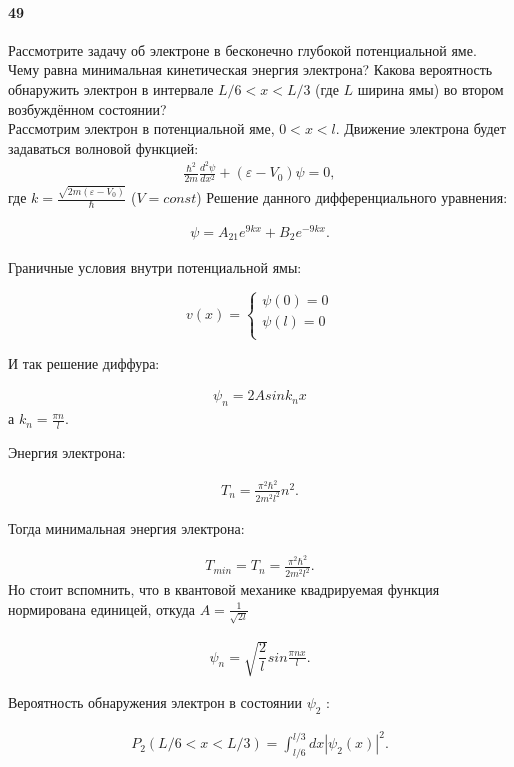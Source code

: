 




\paragraph{49}
Рассмотрите задачу об электроне в бесконечно глубокой потенциальной яме. Чему равна минимальная кинетическая энергия электрона? Какова вероятность обнаружить электрон в интервале $L/6<x<L/3$ (где $L$ ширина ямы) во втором возбуждённом состоянии?\\

Рассмотрим электрон в потенциальной яме, $0<x<l$.
Движение электрона будет задаваться волновой функцией:
\begin{gather}
 \frac{\hbar^{2}}{2m}\frac{d^{2}\psi}{dx^{2}}+(\varepsilon-V_{0})\psi=0,
\end{gather}
где $k=\frac{\sqrt{2m(\varepsilon-V_{0})}}{\hbar}$ ($V=const$)
Решение данного дифференциального уравнения:

\begin{gather}
\psi=A_{21}e^{9kx}+B_{2}e^{-9kx}.
\end{gather}

Граничные условия внутри потенциальной ямы:

$$
v(x)=
\left\{
\begin{gathered}
\psi(0)=0\\
\psi(l)=0\\
\end{gathered}
\right.
$$

И так решение диффура: 

\begin{gather}
\psi_{n}=2A sin{k_{n}x}
\end{gather}
а $k_{n}=\frac{\pi n}{l}.$

Энергия электрона:

\begin{gather}
T_{n}=\frac{\pi^{2}\hbar^{2}}{2m^{2}l^{2}}{}n^{2}.
\end{gather}

Тогда минимальная энергия электрона:

\begin{gather}
T_{min}=T_{n}=\frac{\pi^{2}\hbar^{2}}{2m^{2}l^{2}}.
\end{gather}
Но стоит вспомнить, что в квантовой механике квадрируемая функция нормирована единицей, откуда $A=\frac{1}{\sqrt{2l}}$

\begin{gather}
\psi_{n}=\sqrt{\dfrac{2}{l}} sin{\frac{\pi n x}{l}}.
\end{gather}

Вероятность обнаружения электрон в состоянии $\psi_{2}$ :

\begin{gather}
P_{2}(L/6<x<L/3)=\int_{l/6}^{l/3}dx|\psi_{2}(x)|^{2}.
\end{gather}



